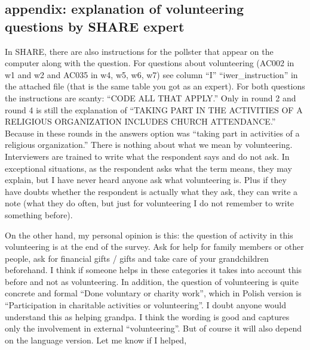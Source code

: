 \documentclass[10pt, letterpaper]{article}
\begin{document}
\begin{spacing}{1.4}
\section{appendix: explanation of volunteering questions by SHARE expert}%

In SHARE, there are also instructions for the pollster that appear on the
computer along with the question. For questions about volunteering (AC002 in w1
and w2 and AC035 in w4, w5, w6, w7) see column ``I'' ``iwer\_instruction'' in the
attached file (that is the same table you got as an expert).
For both questions the instructions are scanty: ``CODE ALL THAT APPLY.'' Only in
round 2 and round 4 is still the explanation of ``TAKING PART IN THE ACTIVITIES
OF A RELIGIOUS ORGANIZATION INCLUDES CHURCH ATTENDANCE.'' Because in these
rounds in the answers option was ``taking part in activities of a religious
organization.'' There is nothing about what we mean by
volunteering. Interviewers are trained to write what the respondent says and do
not ask. In exceptional situations, as the respondent asks what the term means,
they may explain, but I have never heard anyone ask what volunteering is. Plus
if they have doubts whether the respondent is actually what they ask, they can
write a note (what they do often, but just for volunteering I do not remember to
write something before).

On the other hand, my personal opinion is this: the question of activity in this
volunteering is at the end of the survey. Ask for help for family members or
other people, ask for financial gifts / gifts and take care of your
grandchildren beforehand. I think if someone helps in these categories it takes
into account this before and not as volunteering.
In addition, the question of volunteering is quite concrete and formal ``Done
voluntary or charity work'', which in Polish version is ``Participation in
charitable activities or volunteering''. I doubt anyone would understand this as
helping grandpa. I think the wording is good and captures only the involvement
in external ``volunteering''. But of course it will also depend on the language
version.
Let me know if I helped,

\end{spacing}
\end{document}
